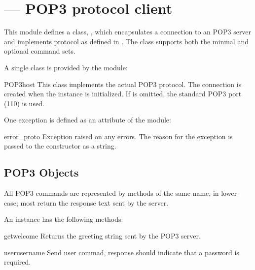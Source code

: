 
\section{ ---
         POP3 protocol client}



This module defines a class, , which encapsulates a
connection to an POP3 server and implements protocol as defined in
.  The  class supports both the minmal and
optional command sets.

A single class is provided by the  module:

\begin{classdesc}{POP3}{host}
This class implements the actual POP3 protocol.  The connection is
created when the instance is initialized.
If  is omitted, the standard POP3 port (110) is used.
\end{classdesc}

One exception is defined as an attribute of the  module:

\begin{excdesc}{error_proto}
Exception raised on any errors.  The reason for the exception is
passed to the constructor as a string.
\end{excdesc}


\subsection{POP3 Objects \label{pop3-objects}}

All POP3 commands are represented by methods of the same name,
in lower-case; most return the response text sent by the server.

An  instance has the following methods:


\begin{methoddesc}{getwelcome}{}
Returns the greeting string sent by the POP3 server.
\end{methoddesc}


\begin{methoddesc}{user}{username}
Send user commad, response should indicate that a password is required.
\end{methoddesc}

